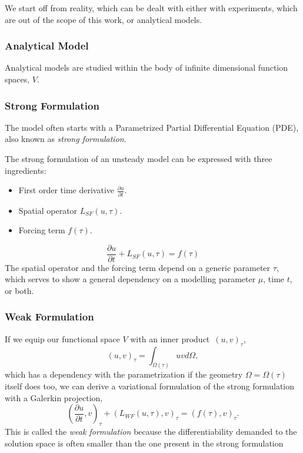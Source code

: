 \documentclass[../main.tex]{subfiles}
\begin{document}
We start off from reality, which can be dealt with either with experiments, which are out of the scope of this work, or analytical models.

\subsubsection{Analytical Model}
Analytical models are studied within the body of infinite dimensional function spaces, $V$.

\subsubsection*{Strong Formulation}
The model often starts with a Parametrized Partial Differential Equation (PDE), also known as \textit{strong formulation}.

The strong formulation of an unsteady model can be expressed with three ingredients:
\begin{itemize}
    \item First order time derivative $\frac{\partial u}{\partial t}$.
    \item Spatial operator $L_{SF}(u, \tau)$.
    \item Forcing term $f(\tau)$.
\end{itemize}
\begin{equation}
    \frac{\partial u}{\partial t} + L_{SF}(u, \tau) = f(\tau)
\end{equation}
The spatial operator and the forcing term depend on a generic parameter $\tau$, which serves to show a general dependency on a modelling parameter $\mu$, time $t$, or both.

\subsubsection*{Weak Formulation}
If we equip our functional space $V$ with an inner product~$(u,v)_\tau$,
\begin{equation}
    (u,v)_\tau = \int_{\Omega(\tau)} u v d\Omega,
\end{equation}
which has a dependency with the parametrization if the geometry $\Omega = \Omega(\tau)$ itself does too,
we can derive a variational formulation of the strong formulation with a Galerkin projection,
\begin{equation}
    \left(\frac{\partial u}{\partial t}, v \right)_{\tau} + \left(L_{WF}(u, \tau), v \right)_{\tau} = \left(f(\tau), v \right)_{\tau}.
\end{equation}
This is called the \textit{weak formulation} because the differentiability demanded to the solution space is often smaller than the one present in the strong formulation
\end{document}
